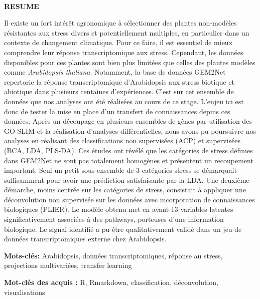 \documentclass[twoside]{article}
\begin{document}
\newpage
\thispagestyle{empty}
~


\newpage
\thispagestyle{empty}
\textbf{\Huge RESUME}

\vspace{1cm}
Il existe un fort intérêt agronomique à sélectionner des plantes non-modèles résistantes aux stress divers et potentiellement multiples, en particulier dans un contexte de changement climatique. Pour ce faire, il est essentiel de mieux comprendre leur réponse transcriptomique aux stress. Cependant, les données disponibles pour ces plantes sont bien plus limitées que celles des plantes modèles comme \textit{Arabidopsis thaliana}. Notamment, la base de données GEM2Net repertorie la réponse transcriptomique d'Arabidopsis aux stress biotique et abiotique dans plusieurs centaines d'expériences. C'est sur cet ensemble de données que nos analyses ont été réalisées au cours de ce stage. L'enjeu ici est donc de tester la mise en place d'un transfert de connaissances depuis ces données. Après un découpage en plusieurs ensembles de gènes par utilisation des GO SLIM et la réalisation d'analyses différentielles, nous avons pu poursuivre nos analyses en réalisant des classifications non supervisées (ACP) et supervisées (BCA, LDA, PLS-DA). Ces études ont révélé que les catégories de stress définies dans GEM2Net ne sont pas totalement homogènes et présentent un recoupement important. Seul un petit sous-ensemble de 3 catégories stress se démarquait suffisamment pour avoir une prédiction satisfaisante par la LDA. Une deuxième démarche, moins centrée sur les catégories de stress, consistait à appliquer une déconvolution non supervisée sur les données avec incorporation de connaissances biologiques (PLIER). Le modèle obtenu met en avant 13 variables latentes significativement associées à des pathways, porteuses d'une information biologique. Le signal identifié a pu être qualitativement validé dans un jeu de données transcriptomiques externe chez Arabidopsis.

\vspace{1cm}
\textbf{Mots-clés:} Arabidopsis, données transcriptomiques, réponse au stress, projections multivariées,  transfer learning

\vspace{1cm}
\textbf{Mot-clés des acquis :} R, Rmarkdown, classification,  déconvolution, visualisations
\end{document}
